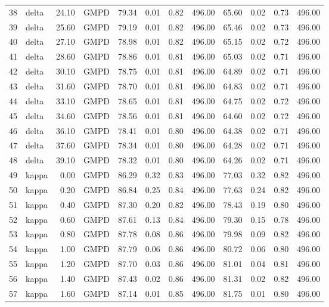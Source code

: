 \begin{table}[ht]
\begin{tabular}{rlrlrrrrrrrr}
  38 & delta & 24.10 & GMPD & 79.34 & 0.01 & 0.82 & 496.00 & 65.60 & 0.02 & 0.73 & 496.00 \\ 
  39 & delta & 25.60 & GMPD & 79.19 & 0.01 & 0.82 & 496.00 & 65.46 & 0.02 & 0.73 & 496.00 \\ 
  40 & delta & 27.10 & GMPD & 78.98 & 0.01 & 0.82 & 496.00 & 65.15 & 0.02 & 0.72 & 496.00 \\ 
  41 & delta & 28.60 & GMPD & 78.86 & 0.01 & 0.81 & 496.00 & 65.03 & 0.02 & 0.71 & 496.00 \\ 
  42 & delta & 30.10 & GMPD & 78.75 & 0.01 & 0.81 & 496.00 & 64.89 & 0.02 & 0.71 & 496.00 \\ 
  43 & delta & 31.60 & GMPD & 78.70 & 0.01 & 0.81 & 496.00 & 64.83 & 0.02 & 0.71 & 496.00 \\ 
  44 & delta & 33.10 & GMPD & 78.65 & 0.01 & 0.81 & 496.00 & 64.75 & 0.02 & 0.72 & 496.00 \\ 
  45 & delta & 34.60 & GMPD & 78.56 & 0.01 & 0.81 & 496.00 & 64.60 & 0.02 & 0.72 & 496.00 \\ 
  46 & delta & 36.10 & GMPD & 78.41 & 0.01 & 0.80 & 496.00 & 64.38 & 0.02 & 0.71 & 496.00 \\ 
  47 & delta & 37.60 & GMPD & 78.34 & 0.01 & 0.80 & 496.00 & 64.28 & 0.02 & 0.71 & 496.00 \\ 
  48 & delta & 39.10 & GMPD & 78.32 & 0.01 & 0.80 & 496.00 & 64.26 & 0.02 & 0.71 & 496.00 \\ 
  49 & kappa & 0.00 & GMPD & 86.29 & 0.32 & 0.83 & 496.00 & 77.03 & 0.32 & 0.82 & 496.00 \\ 
  50 & kappa & 0.20 & GMPD & 86.84 & 0.25 & 0.84 & 496.00 & 77.63 & 0.24 & 0.82 & 496.00 \\ 
  51 & kappa & 0.40 & GMPD & 87.30 & 0.20 & 0.82 & 496.00 & 78.43 & 0.19 & 0.80 & 496.00 \\ 
  52 & kappa & 0.60 & GMPD & 87.61 & 0.13 & 0.84 & 496.00 & 79.30 & 0.15 & 0.78 & 496.00 \\ 
  53 & kappa & 0.80 & GMPD & 87.78 & 0.08 & 0.86 & 496.00 & 79.98 & 0.09 & 0.82 & 496.00 \\ 
  54 & kappa & 1.00 & GMPD & 87.79 & 0.06 & 0.86 & 496.00 & 80.72 & 0.06 & 0.80 & 496.00 \\ 
  55 & kappa & 1.20 & GMPD & 87.70 & 0.03 & 0.86 & 496.00 & 81.01 & 0.04 & 0.81 & 496.00 \\ 
  56 & kappa & 1.40 & GMPD & 87.43 & 0.02 & 0.86 & 496.00 & 81.31 & 0.02 & 0.82 & 496.00 \\ 
  57 & kappa & 1.60 & GMPD & 87.14 & 0.01 & 0.85 & 496.00 & 81.75 & 0.01 & 0.80 & 496.00 \\ 

\end{tabular}
\end{table}
